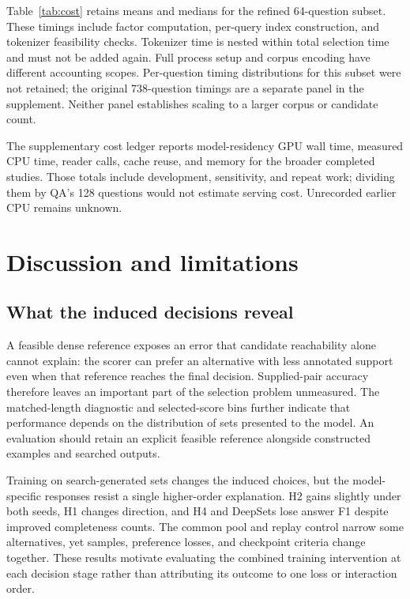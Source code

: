 \documentclass[preprint,12pt]{elsarticle}
\begin{document}
Table~\ref{tab:cost} retains means and medians for the refined 64-question subset. These timings include factor computation, per-query index construction, and tokenizer feasibility checks. Tokenizer time is nested within total selection time and must not be added again. Full process setup and corpus encoding have different accounting scopes. Per-question timing distributions for this subset were not retained; the original 738-question timings are a separate panel in the supplement. Neither panel establishes scaling to a larger corpus or candidate count.



The supplementary cost ledger reports model-residency GPU wall time, measured CPU time, reader calls, cache reuse, and memory for the broader completed studies. Those totals include development, sensitivity, and repeat work; dividing them by QA's 128 questions would not estimate serving cost. Unrecorded earlier CPU remains unknown.

\section{Discussion and limitations}
\subsection{What the induced decisions reveal}
A feasible dense reference exposes an error that candidate reachability alone cannot explain: the scorer can prefer an alternative with less annotated support even when that reference reaches the final decision. Supplied-pair accuracy therefore leaves an important part of the selection problem unmeasured. The matched-length diagnostic and selected-score bins further indicate that performance depends on the distribution of sets presented to the model. An evaluation should retain an explicit feasible reference alongside constructed examples and searched outputs.

Training on search-generated sets changes the induced choices, but the model-specific responses resist a single higher-order explanation. H2 gains slightly under both seeds, H1 changes direction, and H4 and DeepSets lose answer F1 despite improved completeness counts. The common pool and replay control narrow some alternatives, yet samples, preference losses, and checkpoint criteria change together. These results motivate evaluating the combined training intervention at each decision stage rather than attributing its outcome to one loss or interaction order.
\end{document}
